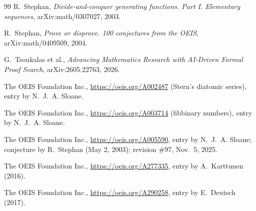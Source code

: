 \documentclass[11pt]{amsart}
\theoremstyle{plain}
\theoremstyle{definition}
\begin{document}
{\begin{thebibliography}{99}
R.~Stephan, \emph{Divide-and-conquer generating functions. Part I. Elementary sequences}, arXiv:math/0307027, 2003.

R.~Stephan, \emph{Prove or disprove. 100 conjectures from the OEIS}, arXiv:math/0409509, 2004.

G.~Tsoukalas et al., \emph{Advancing Mathematics Research with AI-Driven Formal Proof Search}, arXiv:2605.22763, 2026.

The OEIS Foundation Inc., \url{https://oeis.org/A002487} (Stern's diatomic series), entry by N.~J.~A. Sloane.

The OEIS Foundation Inc., \url{https://oeis.org/A003714} (fibbinary numbers), entry by N.~J.~A. Sloane.

The OEIS Foundation Inc., \url{https://oeis.org/A005590}, entry by N.~J.~A. Sloane; conjecture by R.~Stephan (May 2, 2003); revision \#97, Nov.~5, 2025.

The OEIS Foundation Inc., \url{https://oeis.org/A277335}, entry by A.~Karttunen (2016).

The OEIS Foundation Inc., \url{https://oeis.org/A290258}, entry by E.~Deutsch (2017).

\end{thebibliography}
}
\end{document}
